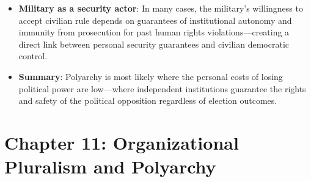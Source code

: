 \documentclass[12pt]{article}
\begin{document}
\begin{itemize}[leftmargin=*, itemsep=4pt]
    \item \textbf{Military as a security actor}: In many cases, the military's willingness to accept civilian rule depends on guarantees of institutional autonomy and immunity from prosecution for past human rights violations---creating a direct link between personal security guarantees and civilian democratic control.
    \item \textbf{Summary}: Polyarchy is most likely where the personal costs of losing political power are low---where independent institutions guarantee the rights and safety of the political opposition regardless of election outcomes.
\end{itemize}

\section{Chapter 11: Organizational Pluralism and Polyarchy}
\end{document}
